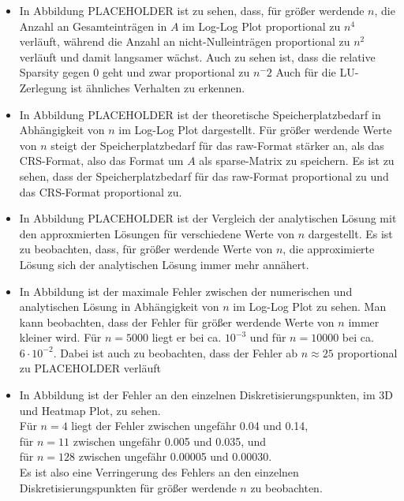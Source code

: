 \documentclass{scrartcl}
\begin{document}
\begin{itemize}
    \item In Abbildung PLACEHOLDER ist zu sehen, dass, für größer werdende
          \(n\), die Anzahl an Gesamteinträgen in \(A\) im Log-Log Plot
          proportional zu \(n^4\) verläuft, während die Anzahl an
          nicht-Nulleinträgen proportional zu \(n^2\) verläuft und damit
          langsamer wächst. Auch zu sehen ist, dass die relative Sparsity gegen
          0 geht und zwar proportional zu \(n^-2\) Auch für die LU-Zerlegung
          ist ähnliches Verhalten zu erkennen.%


    \item In Abbildung PLACEHOLDER ist der theoretische Speicherplatzbedarf in
          Abhängigkeit von \(n\) im Log-Log Plot dargestellt. Für größer
          werdende Werte von \(n\) steigt der Speicherplatzbedarf für das
          raw-Format stärker an, als das CRS-Format, also das Format um \(A\)
          als sparse-Matrix zu speichern. Es ist zu sehen, dass der
          Speicherplatzbedarf für das raw-Format proportional zu und das
          CRS-Format proportional zu. %

    \item In Abbildung PLACEHOLDER ist der Vergleich der analytischen Lösung
          mit den approxmierten Lösungen für verschiedene Werte von \(n\)
          dargestellt. Es ist zu beobachten, dass, für größer werdende Werte
          von \(n\), die approximierte Lösung sich der analytischen Lösung
          immer mehr annähert.%

    \item In Abbildung ist der maximale Fehler zwischen der numerischen und
          analytischen Lösung in Abhängigkeit von \(n\) im Log-Log Plot zu
          sehen. Man kann beobachten, dass der Fehler für größer werdende Werte
          von \(n\) immer kleiner wird. Für \(n = 5000\) liegt er bei ca.
          \(10^{-3}\) und für \(n = 10000\) bei ca. \(6 \cdot 10^{-2}\). Dabei
          ist auch zu beobachten, dass der Fehler ab \(n \approx 25\)
          proportional zu PLACEHOLDER%
          verläuft

    \item In Abbildung ist der Fehler an den einzelnen Diskretisierungspunkten,
          im 3D und Heatmap Plot, zu sehen. \\ Für \(n = 4\) liegt der Fehler
          zwischen ungefähr 0.04 und 0.14, \\ für \(n = 11\) zwischen ungefähr
          0.005 und 0.035, und \\ für \(n = 128\) zwischen ungefähr 0.00005 und
          0.00030. \\ Es ist also eine Verringerung des Fehlers an den
          einzelnen Diskretisierungspunkten für größer werdende \(n\) zu
          beobachten.%
\end{itemize}
\end{document}
